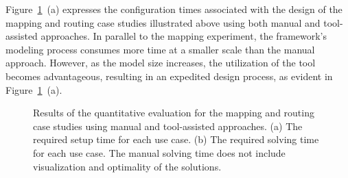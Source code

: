     
    
    Figure~\ref{qual_routing}~(a) expresses the configuration times associated with the design of the mapping and routing case studies illustrated above using both manual and tool-assisted approaches. In parallel to the mapping experiment, the framework's modeling process consumes more time at a smaller scale than the manual approach. However, as the model size increases, the utilization of the tool becomes advantageous, resulting in an expedited design process, as evident in Figure~\ref{qual_routing}~(a).
    
     \begin{figure}[t]
	\centering
	\caption{ 
    Results of the quantitative evaluation for the mapping and routing case studies using manual and tool-assisted approaches. (a) The required setup time for each use case. (b) The required solving time for each use case. The manual solving time does not include visualization and optimality of the solutions.}
	\label{qual_routing}
    \end{figure}
    
